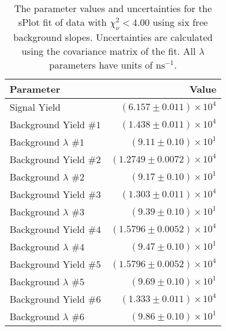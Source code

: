 
\begin{table}[ht]
    \begin{center}
        \begin{tabular}{lr}\toprule
            Parameter & Value \\\midrule
            Signal Yield & $(6.157 \pm 0.011) \times 10^{4}$ \\
            Background Yield $\#1$ & $(1.438 \pm 0.011) \times 10^{4}$ \\
            Background $\lambda$ $\#1$ & $(9.11 \pm 0.10) \times 10^{1}$ \\
            Background Yield $\#2$ & $(1.2749 \pm 0.0072) \times 10^{4}$ \\
            Background $\lambda$ $\#2$ & $(9.17 \pm 0.10) \times 10^{1}$ \\
            Background Yield $\#3$ & $(1.303 \pm 0.011) \times 10^{4}$ \\
            Background $\lambda$ $\#3$ & $(9.39 \pm 0.10) \times 10^{1}$ \\
            Background Yield $\#4$ & $(1.5796 \pm 0.0052) \times 10^{4}$ \\
            Background $\lambda$ $\#4$ & $(9.47 \pm 0.10) \times 10^{1}$ \\
            Background Yield $\#5$ & $(1.5796 \pm 0.0052) \times 10^{4}$ \\
            Background $\lambda$ $\#5$ & $(9.69 \pm 0.10) \times 10^{1}$ \\
            Background Yield $\#6$ & $(1.333 \pm 0.011) \times 10^{4}$ \\
            Background $\lambda$ $\#6$ & $(9.86 \pm 0.10) \times 10^{1}$ \\\bottomrule
        \end{tabular}
        \caption{The parameter values and uncertainties for the sPlot fit of data with $\chi^2_\nu < 4.00$ using six free background slopes. Uncertainties are calculated using the covariance matrix of the fit. All $\lambda$ parameters have units of $\si{\nano\second}^{-1}$.}\label{tab:splot-fit-results-chisqdof-4.00-free-6}
    \end{center}
\end{table}
